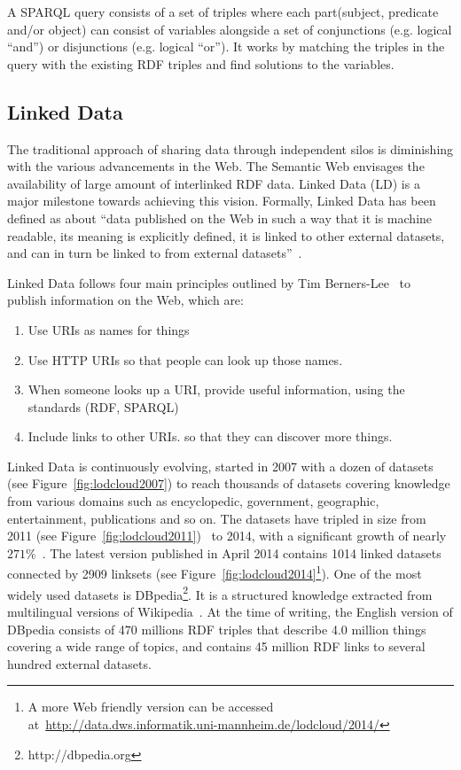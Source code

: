 A SPARQL query consists of a set of triples where each part(subject, predicate and/or object) can consist of variables alongside a set of conjunctions (e.g. logical ``and'') or disjunctions (e.g. logical ``or''). It works by matching the triples in the query with the existing RDF triples and find solutions to the variables.

\subsection{Linked Data}

The traditional approach of sharing data through independent silos is diminishing with the various advancements in the Web. The Semantic Web envisages the availability of large amount of interlinked RDF data. Linked Data (LD) is a major milestone towards achieving this vision. Formally, Linked Data has been defined as about ``data published on the Web in such a way that it is machine readable, its meaning is explicitly defined, it is linked to other external datasets, and can in turn be linked to from external datasets''~\cite{Bizer:IJSWIS:09}.

Linked Data follows four main principles outlined by Tim Berners-Lee~\cite{Berners-Lee:W3C:06} to publish information on the Web, which are:

\begin{enumerate}
	\item Use URIs as names for things
	\item Use HTTP URIs so that people can look up those names.
	\item When someone looks up a URI, provide useful information, using the standards (RDF, SPARQL)
	\item Include links to other URIs. so that they can discover more things.
\end{enumerate}

Linked Data is continuously evolving, started in 2007 with a dozen of datasets (see Figure~\ref{fig:lodcloud2007}) to reach thousands of datasets covering knowledge from various domains such as encyclopedic, government, geographic, entertainment, publications and so on. The datasets have tripled in size from 2011 (see Figure~\ref{fig:lodcloud2011})~\cite{Jentzsch:SOLOD:11} to 2014, with a significant growth of nearly $271\%$~\cite{Schmachtenberg:ISWC:14}. The latest version published in April 2014 contains 1014 linked datasets connected by 2909 linksets (see Figure~\ref{fig:lodcloud2014}\footnote{A more Web friendly version can be accessed at~\url{http://data.dws.informatik.uni-mannheim.de/lodcloud/2014/}}). One of the most widely used datasets is DBpedia\footnote{http://dbpedia.org}. It is a structured knowledge extracted from multilingual versions of Wikipedia~\cite{Bizer:WebSemJorunal:09}. At the time of writing, the English version of DBpedia consists of 470 millions RDF triples that describe 4.0 million things covering a wide range of topics, and contains 45 million RDF links to several hundred external datasets.

